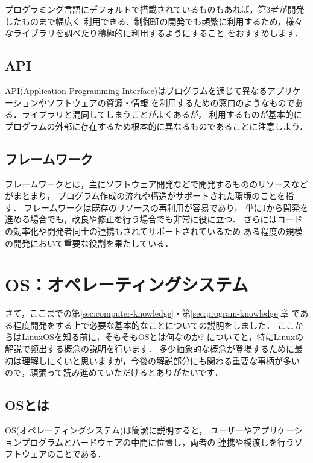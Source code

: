 \documentclass[autodetect-engine,dvi=dvipdfmx,ja=standard,a4j]{bxjsarticle}
\begin{document}
プログラミング言語にデフォルトで搭載されているものもあれば，第3者が開発したものまで幅広く
利用できる．制御班の開発でも頻繁に利用するため，様々なライブラリを調べたり積極的に利用するようにすること
をおすすめします．

\subsection{API}
API(Application Programming Interface)はプログラムを通じて異なるアプリケーションやソフトウェアの資源・情報
を利用するための窓口のようなものである．ライブラリと混同してしまうことがよくあるが，
利用するものが基本的にプログラムの外部に存在するため根本的に異なるものであることに注意しよう．

\subsection{フレームワーク}
フレームワークとは，主にソフトウェア開発などで開発するもののリソースなどがまとまり，
プログラム作成の流れや構造がサポートされた環境のことを指す．
フレームワークは既存のリソースの再利用が容易であり，
単に1から開発を進める場合でも，改良や修正を行う場合でも非常に役に立つ．
さらにはコードの効率化や開発者同士の連携もされてサポートされているため
ある程度の規模の開発において重要な役割を果たしている．

\section{OS：オペレーティングシステム}
さて，ここまでの第\ref{sec:computer-knowledge}・第\ref{sec:program-knowledge}章
である程度開発をする上で必要な基本的なことについての説明をしました．
ここからはLinuxOSを知る前に，そもそもOSとは何なのか? についてと，特にLinuxの解説で頻出する概念の説明を行います．
多少抽象的な概念が登場するために最初は理解しにくいと思いますが，今後の解説部分にも関わる重要な事柄が多い
ので，頑張って読み進めていただけるとありがたいです．

\subsection{OSとは}
OS(オペレーティングシステム)は簡潔に説明すると，
ユーザーやアプリケーションプログラムとハードウェアの中間に位置し，両者の
連携や橋渡しを行うソフトウェアのことである．
\end{document}
